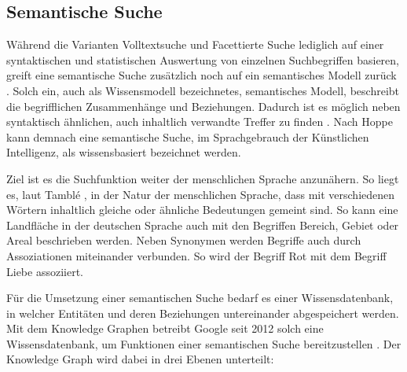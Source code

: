 \subsection{Semantische Suche\label{subsec2.3.4:Unterunterpunkt-4}}

Während die Varianten \glqq Volltextsuche\grqq{} und \glqq Facettierte Suche\grqq{} lediglich auf einer syntaktischen und statistischen Auswertung von einzelnen Suchbegriffen basieren, greift eine semantische Suche zusätzlich noch auf ein semantisches Modell zurück \cite[S. 4f]{Hoppe.2020}. Solch ein, auch als \glqq Wissensmodell\grqq{} bezeichnetes, semantisches Modell, beschreibt die begrifflichen Zusammenhänge und Beziehungen. Dadurch ist es möglich neben syntaktisch ähnlichen, auch inhaltlich verwandte Treffer zu finden \cite[S. 3]{Hoppe.2020}. Nach Hoppe \cite[S. 3]{Hoppe.2020} kann demnach eine semantische Suche, im Sprachgebrauch der Künstlichen Intelligenz, als wissensbasiert bezeichnet werden.

Ziel ist es die Suchfunktion weiter der menschlichen Sprache anzunähern. So liegt es, laut Tamblé \cite{MelanieTamble.2012}, in der Natur der menschlichen Sprache, dass mit verschiedenen Wörtern inhaltlich gleiche oder ähnliche Bedeutungen gemeint sind. So kann eine Landfläche in der deutschen Sprache auch mit den Begriffen \glqq Bereich\grqq{}, \glqq Gebiet\grqq{} oder \glqq Areal\grqq{} beschrieben werden. Neben Synonymen werden Begriffe auch durch Assoziationen miteinander verbunden. So wird der Begriff \glqq Rot\grqq{} mit dem Begriff \glqq Liebe\grqq{} assoziiert.

Für die Umsetzung einer semantischen Suche bedarf es einer Wissensdatenbank, in welcher Entitäten und deren Beziehungen untereinander abgespeichert werden. Mit dem Knowledge Graphen betreibt Google seit 2012 solch eine Wissensdatenbank, um Funktionen einer semantischen Suche bereitzustellen \cite{OlafKopp.2021}. Der Knowledge Graph wird dabei in drei Ebenen unterteilt: \cite{OlafKopp.2021}

